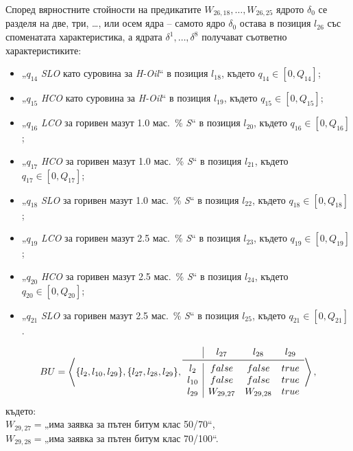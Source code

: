 Според вярностните стойности на предикатите $W_{26,18}, \ldots, W_{26,25}$ ядрото $\delta_0$ се разделя на две, три, …, или осем ядра – самото ядро $\delta_0$ остава в позиция $l_{26}$ със споменатата характеристика, а ядрата $\delta^1, …, \delta^8$ получават съответно характеристиките:
\begin{itemize}
	\item „$q_{14}$ \textit{SLO} като суровина за \textit{H-Oil}“ в позиция $l_{18}$, където $q_{14} \in [0, Q_{14}]$;
	\item „$q_{15}$ \textit{HCO} като суровина за \textit{H-Oil}“ в позиция $l_{19}$, където $q_{15} \in [0, Q_{15}]$;
	\item „$q_{16}$ \textit{LCO} за горивен мазут 1.0 мас.\ \% \textit{S}“ в позиция $l_{20}$, където $q_{16} \in [0, Q_{16}]$;
	\item „$q_{17}$ \textit{HCO} за горивен мазут 1.0 мас.\ \% \textit{S}“ в позиция $l_{21}$, където $q_{17} \in [0, Q_{17}]$;
	\item „$q_{18}$ \textit{SLO} за горивен мазут 1.0 мас.\ \% \textit{S}“ в позиция $l_{22}$, където $q_{18} \in [0, Q_{18}]$;
	\item „$q_{19}$ \textit{LCO} за горивен мазут 2.5 мас.\ \% \textit{S}“ в позиция $l_{23}$, където $q_{19} \in [0, Q_{19}]$;
	\item „$q_{20}$ \textit{HCO} за горивен мазут 2.5 мас.\ \% \textit{S}“ в позиция $l_{24}$, където $q_{20} \in [0, Q_{20}]$;
	\item „$q_{21}$ \textit{SLO} за горивен мазут 2.5 мас.\ \% \textit{S}“ в позиция $l_{25}$, където $q_{21} \in [0, Q_{21}]$.
\end{itemize}

$$BU = \left \langle\{l_{2}, l_{10}, l_{29}\}, \{l_{27}, l_{28}, l_{29} \},
\begin{array}{c|ccc}
	& l_{27}  & l_{28}    & l_{29}   \\ \midrule
	l_{2} &false  & false &  true\\
	l_{10} &false  & false &  true\\
	l_{29}  & W_{29,27} & W_{29,28}  &  true\\
\end{array} \right \rangle , $$
където: \vspace{2mm}\\
$W_{29,27} = $„има заявка за пътен битум клас 50/70“,\\
$W_{29,28} = $„има заявка за пътен битум клас 70/100“.\vspace{2mm}

